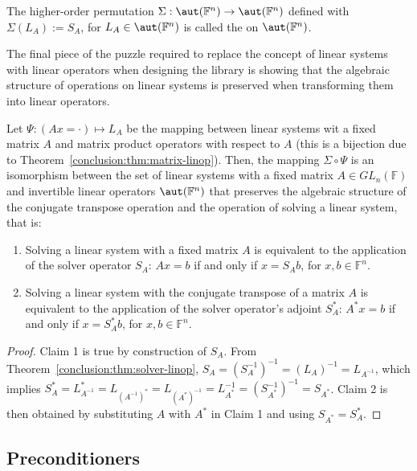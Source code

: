 \begin{definition}
\label{conclusion:def:solver-factory}
The higher-order permutation $\Sigma : \aut(\mathbb{F}^n) \rightarrow
\aut(\mathbb{F}^n)$ defined with $\Sigma(L_A) := S_A$, for $L_A \in
\aut(\mathbb{F}^n)$ is called the  on
$\aut(\mathbb{F}^n)$.
\end{definition}

The final piece of the puzzle required to replace the concept of linear systems
with linear operators when designing the library is showing that the algebraic
structure of operations on linear systems is preserved when transforming them
into linear operators.

\begin{corollary}
\label{conclusion:cor:solver-linop}
Let $\Psi : (Ax = \cdot) \mapsto L_A$ be the mapping between linear systems wit
a fixed matrix $A$ and matrix product operators with respect to $A$ (this is a
bijection due to Theorem~\ref{conclusion:thm:matrix-linop}).
Then, the mapping $\Sigma \circ \Psi$ is an isomorphism between the set of
linear systems with a fixed matrix $A \in GL_n(\mathbb{F})$ and invertible
linear operators $\aut(\mathbb{F}^n)$ that preserves the algebraic structure of
the conjugate transpose operation and the operation of solving a linear system,
that is:
\begin{enumerate}
\item Solving a linear system with a fixed matrix $A$ is equivalent to the
application of the solver operator $S_A$: $Ax = b$ if and only if $x = S_Ab$,
for $x, b \in \mathbb{F}^n$.
\item Solving a linear system with the conjugate transpose of a matrix $A$ is
equivalent to the application of the solver operator's adjoint $S_A^*$:
$A^*x = b$ if and only if $x = S_A^*b$, for $x, b \in \mathbb{F}^n$.
\end{enumerate}
\end{corollary}

\begin{proof}
Claim 1 is true by construction of $S_A$. From
Theorem~\ref{conclusion:thm:solver-linop}, $S_A = (S_A^{-1})^{-1} = (L_A)^{-1} =
L_{A^{-1}}$, which implies $S_A^* = L_{A^{-1}}^* = L_{(A^{-1})^*} =
L_{(A^*)^{-1}} = L_{A^*}^{-1} = (S_{A^*}^{-1})^{-1} = S_{A^*}$. Claim 2 is then
obtained by substituting $A$ with $A^*$ in Claim 1 and using $S_{A^*} = S_A^*$.
\end{proof}

\subsection{Preconditioners}

